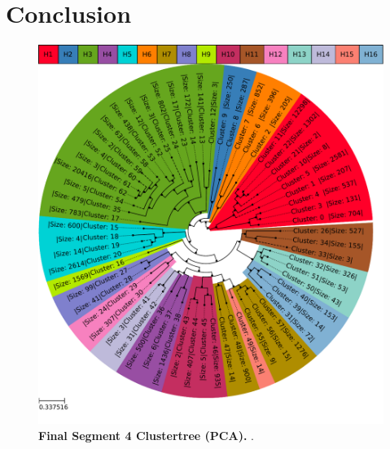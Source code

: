 \chapter{Conclusion} \label{chap:Conclusion}

\blindtext


\begin{figure}[!hbt]
    \centering
    \includegraphics[width=\dimexpr\textwidth-2\fboxsep-2\fboxrule,fbox]{Extra_Graphics/Clustertree_Segment_4.pdf}
    \caption[Final Segment 4 Clustertree (\Acrshort{PCA})]{\textbf{Final Segment 4 Clustertree (\Acrshort{PCA}).} .}
    \label{fig:PCA_Clusteree_Final}
\end{figure}